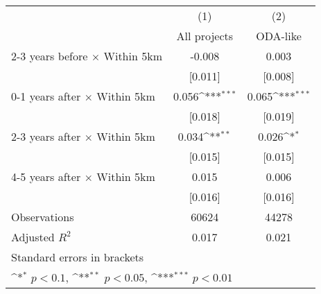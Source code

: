 {
\def\sym#1{\ifmmode^{#1}\else\(^{#1}\)\fi}
\begin{tabular}{l*{2}{c}}
\hline\hline
                    &\multicolumn{1}{c}{(1)}&\multicolumn{1}{c}{(2)}\\
                    &\multicolumn{1}{c}{All projects}&\multicolumn{1}{c}{ODA-like}\\
\hline
2-3 years before $\times$ Within 5km&      -0.008         &       0.003         \\
                    &     [0.011]         &     [0.008]         \\
0-1 years after $\times$ Within 5km&       0.056\sym{***}&       0.065\sym{***}\\
                    &     [0.018]         &     [0.019]         \\
2-3 years after $\times$ Within 5km&       0.034\sym{**} &       0.026\sym{*}  \\
                    &     [0.015]         &     [0.015]         \\
4-5 years after $\times$ Within 5km&       0.015         &       0.006         \\
                    &     [0.016]         &     [0.016]         \\
\hline
Observations        &       60624         &       44278         \\
Adjusted \(R^{2}\)  &       0.017         &       0.021         \\
\hline\hline
\multicolumn{3}{l}{\footnotesize Standard errors in brackets}\\
\multicolumn{3}{l}{\footnotesize \sym{*} \(p<0.1\), \sym{**} \(p<0.05\), \sym{***} \(p<0.01\)}\\
\end{tabular}
}
